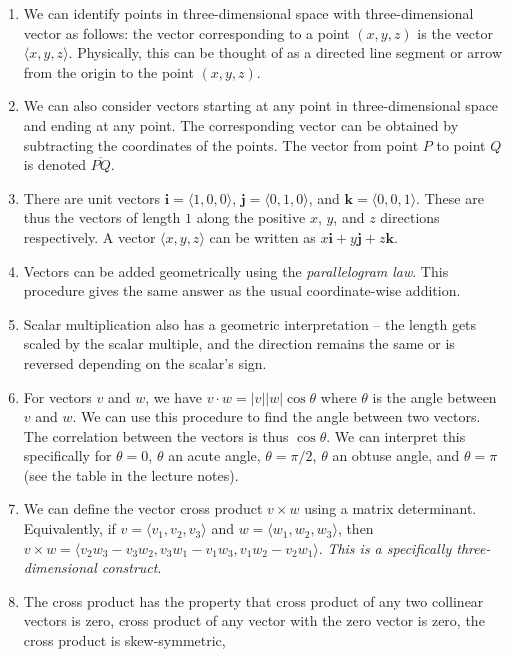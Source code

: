 \documentclass[10pt]{amsart}
\begin{document}
\begin{enumerate}
\item We can identify points in three-dimensional space with
  three-dimensional vector as follows: the vector corresponding to a
  point $(x,y,z)$ is the vector $\langle x,y,z \rangle$. Physically,
  this can be thought of as a directed line segment or arrow from the
  origin to the point $(x,y,z)$.
\item We can also consider vectors starting at any point in
  three-dimensional space and ending at any point. The corresponding
  vector can be obtained by subtracting the coordinates of the
  points. The vector from point $P$ to point $Q$ is denoted
  $\overline{PQ}$.
\item There are unit vectors $\mathbf{i} = \langle 1,0,0 \rangle$,
  $\mathbf{j} = \langle 0,1,0 \rangle$, and $\mathbf{k} = \langle
  0,0,1 \rangle$. These are thus the vectors of length $1$ along the
  positive $x$, $y$, and $z$ directions respectively. A vector
  $\langle x,y,z \rangle$ can be written as $x\mathbf{i} + y\mathbf{j}
  + z\mathbf{k}$.
\item Vectors can be added geometrically using the {\em parallelogram
  law}. This procedure gives the same answer as the usual
  coordinate-wise addition.
\item Scalar multiplication also has a geometric interpretation -- the
  length gets scaled by the scalar multiple, and the direction remains
  the same or is reversed depending on the scalar's sign.
\item For vectors $v$ and $w$, we have $v \cdot w = |v||w|\cos \theta$
  where $\theta$ is the angle between $v$ and $w$. We can use this
  procedure to find the angle between two vectors. The correlation
  between the vectors is thus $\cos \theta$. We can interpret this
  specifically for $\theta = 0$, $\theta$ an acute angle, $\theta =
  \pi/2$, $\theta$ an obtuse angle, and $\theta = \pi$ (see the table
  in the lecture notes).
\item We can define the vector cross product $v \times w$ using a
  matrix determinant. Equivalently, if $v = \langle v_1,v_2,v_3
  \rangle$ and $w = \langle w_1,w_2,w_3 \rangle$, then $v \times w =
  \langle v_2w_3 - v_3w_2, v_3w_1 - v_1w_3, v_1w_2 - v_2w_1
  \rangle$. {\em This is a specifically three-dimensional construct}.
\item The cross product has the property that cross product of any two
  collinear vectors is zero, cross product of any vector with the
  zero vector is zero, the cross product is skew-symmetric,

\end{enumerate}
\end{document}
